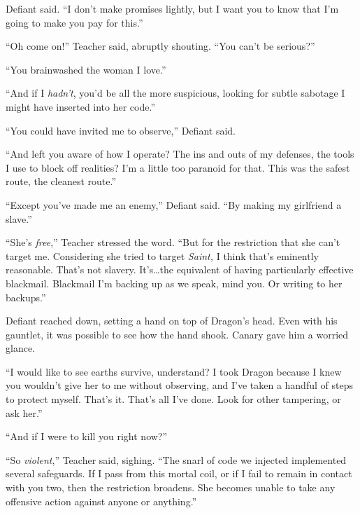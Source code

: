Defiant said.  ``I don't make promises lightly, but I want you to know that I'm going to make you pay for this.''



``Oh come on!''  Teacher said, abruptly shouting.  ``You can't be serious?''



``You brainwashed the woman I love.''



``And if I \emph{hadn't}, you'd be all the more suspicious, looking for subtle sabotage I might have inserted into her code.''



``You could have invited me to observe,'' Defiant said.



``And left you aware of how I operate?  The ins and outs of my defenses, the tools I use to block off realities?  I'm a little too paranoid for that.  This was the safest route, the cleanest route.''



``Except you've made me an enemy,'' Defiant said.  ``By making my girlfriend a slave.''



``She's \emph{free},'' Teacher stressed the word.  ``But for the restriction that she can't target me.  Considering she tried to target \emph{Saint, }I think that's eminently reasonable.  That's not slavery.  It's\ldots the equivalent of having particularly effective blackmail.  Blackmail I'm backing up as we speak, mind you.  Or writing to her backups.''



Defiant reached down, setting a hand on top of Dragon's head.  Even with his gauntlet, it was possible to see how the hand shook.  Canary gave him a worried glance.



``I would like to see earths survive, understand?  I took Dragon because I knew you wouldn't give her to me without observing, and I've taken a handful of steps to protect myself.  That's it.  That's all I've done.  Look for other tampering, or ask her.''



``And if I were to kill you right now?''



``So \emph{violent},'' Teacher said, sighing.  ``The snarl of code we injected implemented several safeguards.  If I pass from this mortal coil, or if I fail to remain in contact with you two, then the restriction broadens.  She becomes unable to take any offensive action against anyone or anything.''



